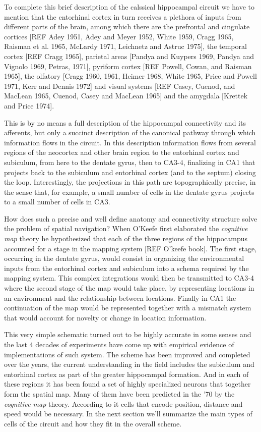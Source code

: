 To complete this brief description of the calssical hippocampal circuit we have to mention that the entorhinal cortex in turn receives a plethora of inputs from different parts of the brain, among which there are the prefrontal and cingulate cortices [REF Adey 1951, Adey and Meyer 1952, White 1959, Cragg 1965, Raisman et al. 1965, McLardy 1971, Leichnetz and Astruc 1975], the temporal cortex [REF Cragg 1965], parietal areas [Pandya and Kuypers 1969, Pandya and Vignolo 1969, Petras, 1971], pyriform cortex [REF Powell, Cowan, and Raisman 1965], the olfatory [Cragg 1960, 1961, Heimer 1968, White 1965, Price and Powell 1971, Kerr and Dennis 1972] and visual systems [REF Casey, Cuenod, and MacLean 1965, Cuenod, Casey and MacLean 1965] and the amygdala [Krettek and Price 1974].

This is by no means a full description of the hippocampal connectivity and its afferents, but only a succinct description of the canonical pathway through which information flows in the circuit. 
In this description information flows from several regions of the neocortex and other brain region to the entorhinal cortex and subiculum, from here to the dentate gyrus, then to CA3-4, finalizing in CA1 that projects back to the subiculum and entorhinal cortex (and to the septum) closing the loop. 
Interestingly, the projections in this path are topographically precise, in the sense that, for example, a small number of cells in the dentate gyrus projects to a small number of cells in CA3.

How does such a precise and well define anatomy and connectivity structure solve the problem of spatial navigation? 
When O'Keefe first elaborated the \textit{cognitive map} theory he hypothesized that each of the three regions of the hippocampus accounted for a stage in the mapping system [REF O'keefe book].
The first stage, occurring in the dentate gyrus, would consist in organizing the environmental inputs from the entorhinal cortex and subiculum into a schema required by the mapping system. 
This complex integrations would then be transmitted to CA3-4 where the second stage of the map would take place, by representing locations in an environment and the relationship between locations.
Finally in CA1 the continuation of the map would be represented together with a mismatch system that would account for novelty or change in location information.

This very simple schematic turned out to be highly accurate in some senses and the last 4 decades of experiments have come up with empirical evidence of implementations of such system. 
The scheme has been improved and completed over the years, the current understanding in the field includes the subiculum and entorhinal cortex as part of the greater hippocampal formation.
And in each of these regions it has been found a set of highly specialized neurons that together form the spatial map. 
Many of them have been predicted in the '70 by the \textit{cognitive map} theory. 
According to it cells that encode position, distance and speed would be necessary.
In the next section we'll summarize the main types of cells of the circuit and how they fit in the overall scheme. 

